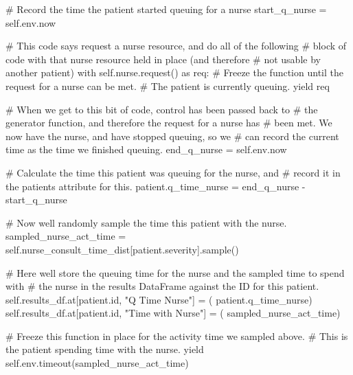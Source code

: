 \documentclass[
  letterpaper,
  DIV=11,
  numbers=noendperiod]{scrreprt}
\newenvironment{Shaded}{}{}
\newcommand{\BuiltInTok}[1]{\textcolor[rgb]{0.84,0.23,0.29}{#1}}
\newcommand{\CommentTok}[1]{\textcolor[rgb]{0.42,0.45,0.49}{#1}}
\newcommand{\ControlFlowTok}[1]{\textcolor[rgb]{0.84,0.23,0.29}{#1}}
\newcommand{\ImportTok}[1]{\textcolor[rgb]{0.01,0.18,0.38}{#1}}
\newcommand{\NormalTok}[1]{\textcolor[rgb]{0.14,0.16,0.18}{#1}}
\newcommand{\OperatorTok}[1]{\textcolor[rgb]{0.14,0.16,0.18}{#1}}
\newcommand{\StringTok}[1]{\textcolor[rgb]{0.01,0.18,0.38}{#1}}
\newcommand{\VariableTok}[1]{\textcolor[rgb]{0.89,0.38,0.04}{#1}}
\newcommand*\circled[1]{\tikz[baseline=(char.base)]{
          \node[shape=circle,draw,inner sep=1pt] (char) {{\scriptsize#1}};}}
\begin{document}
\label{annotated-cell-76}%
\begin{Shaded}
\begin{Highlighting}[]
        \CommentTok{\# Record the time the patient started queuing for a nurse}
\NormalTok{        start\_q\_nurse }\OperatorTok{=} \VariableTok{self}\NormalTok{.env.now}

        \CommentTok{\# This code says request a nurse resource, and do all of the following}
        \CommentTok{\# block of code with that nurse resource held in place (and therefore}
        \CommentTok{\# not usable by another patient)}
        \ControlFlowTok{with} \VariableTok{self}\NormalTok{.nurse.request() }\ImportTok{as}\NormalTok{ req:}
            \CommentTok{\# Freeze the function until the request for a nurse can be met.}
            \CommentTok{\# The patient is currently queuing.}
            \ControlFlowTok{yield}\NormalTok{ req}

            \CommentTok{\# When we get to this bit of code, control has been passed back to}
            \CommentTok{\# the generator function, and therefore the request for a nurse has}
            \CommentTok{\# been met.  We now have the nurse, and have stopped queuing, so we}
            \CommentTok{\# can record the current time as the time we finished queuing.}
\NormalTok{            end\_q\_nurse }\OperatorTok{=} \VariableTok{self}\NormalTok{.env.now}

            \CommentTok{\# Calculate the time this patient was queuing for the nurse, and}
            \CommentTok{\# record it in the patient\textquotesingle{}s attribute for this.}
\NormalTok{            patient.q\_time\_nurse }\OperatorTok{=}\NormalTok{ end\_q\_nurse }\OperatorTok{{-}}\NormalTok{ start\_q\_nurse}

            \CommentTok{\# Now we\textquotesingle{}ll randomly sample the time this patient with the nurse.}
\NormalTok{            sampled\_nurse\_act\_time }\OperatorTok{=} \VariableTok{self}\NormalTok{.nurse\_consult\_time\_dist[patient.severity].sample() }\hspace*{\fill}\NormalTok{\circled{1}}

            \CommentTok{\# Here we\textquotesingle{}ll store the queuing time for the nurse and the sampled time to spend with}
            \CommentTok{\# the nurse in the results DataFrame against the ID for this patient.}
            \VariableTok{self}\NormalTok{.results\_df.at[patient.}\BuiltInTok{id}\NormalTok{, }\StringTok{"Q Time Nurse"}\NormalTok{] }\OperatorTok{=}\NormalTok{ (}
\NormalTok{                patient.q\_time\_nurse)}
            \VariableTok{self}\NormalTok{.results\_df.at[patient.}\BuiltInTok{id}\NormalTok{, }\StringTok{"Time with Nurse"}\NormalTok{] }\OperatorTok{=}\NormalTok{ (}
\NormalTok{                sampled\_nurse\_act\_time)}

            \CommentTok{\# Freeze this function in place for the activity time we sampled above.}
            \CommentTok{\# This is the patient spending time with the nurse.}
            \ControlFlowTok{yield} \VariableTok{self}\NormalTok{.env.timeout(sampled\_nurse\_act\_time)}
\end{Highlighting}
\end{Shaded}
\end{document}
